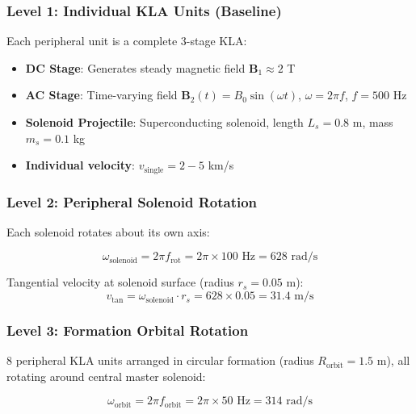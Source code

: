 \documentclass[12pt,a4paper]{article}
\begin{document}
\subsubsection{Level 1: Individual KLA Units (Baseline)}

Each peripheral unit is a complete 3-stage KLA:

\begin{itemize}
\item \textbf{DC Stage}: Generates steady magnetic field $\mathbf{B}_1 \approx 2$ T
\item \textbf{AC Stage}: Time-varying field $\mathbf{B}_2(t) = B_0 \sin(\omega t)$, $\omega = 2\pi f$, $f = 500$ Hz
\item \textbf{Solenoid Projectile}: Superconducting solenoid, length $L_s = 0.8$ m, mass $m_s = 0.1$ kg
\item \textbf{Individual velocity}: $v_{\text{single}} = 2-5$ km/s
\end{itemize}

\subsubsection{Level 2: Peripheral Solenoid Rotation}

Each solenoid rotates about its own axis:

\begin{equation}
\omega_{\text{solenoid}} = 2\pi f_{\text{rot}} = 2\pi \times 100 \text{ Hz} = 628 \text{ rad/s}
\end{equation}

Tangential velocity at solenoid surface (radius $r_s = 0.05$ m):
\begin{equation}
v_{\text{tan}} = \omega_{\text{solenoid}} \cdot r_s = 628 \times 0.05 = 31.4 \text{ m/s}
\end{equation}

\subsubsection{Level 3: Formation Orbital Rotation}

8 peripheral KLA units arranged in circular formation (radius $R_{\text{orbit}} = 1.5$ m), all rotating around central master solenoid:

\begin{equation}
\omega_{\text{orbit}} = 2\pi f_{\text{orbit}} = 2\pi \times 50 \text{ Hz} = 314 \text{ rad/s}
\end{equation}
\end{document}
